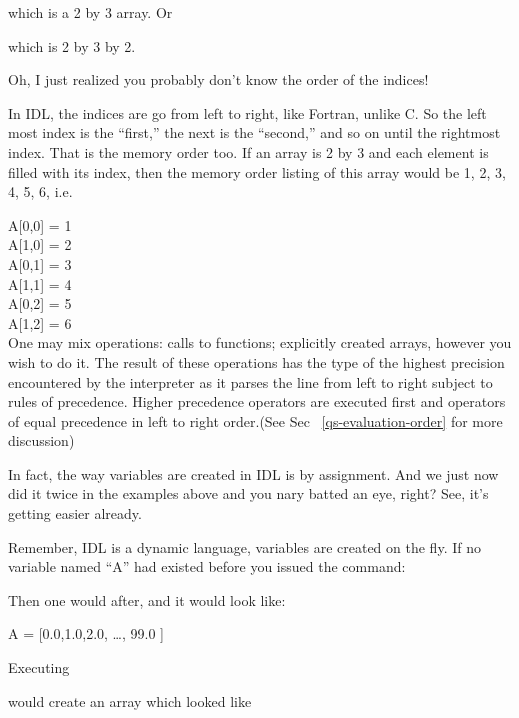 
  which is a 2 by 3 array. Or

	      
  which is 2 by 3 by 2.

  Oh, I just realized you probably don't know the order of the
  indices!

  In IDL, the indices are go from left to right, like Fortran, unlike
  C. So the left most index is the ``first,'' the next is the
  ``second,'' and so on until the rightmost index. That is the memory
  order too. If an array is 2 by 3 and each element is filled with its
  index, then the memory order listing of this array would be 1, 2, 3,
  4, 5, 6, i.e.

  A[0,0] = 1\\
  A[1,0] = 2\\
  A[0,1] = 3\\
  A[1,1] = 4\\
  A[0,2] = 5\\
  A[1,2] = 6\\

  One may mix operations: calls to functions; explicitly created arrays,
  however you wish to do it. The result of these operations has the type
  of the highest precision encountered by the interpreter as it parses
  the line from left to right subject to rules of precedence.  Higher
  precedence operators are executed first and operators of equal
  precedence in left to right order.(See Sec ~\ref{qs-evaluation-order}
    for more discussion)

  In fact, the  way variables are created in IDL is by
  assignment. And we just now did it twice in the examples above and
  you nary batted an eye, right? See, it's getting easier already.

  Remember, IDL is a dynamic language, variables are created on the
  fly. If no variable named ``A'' had existed before you issued the
  command:


  Then one would after, and it would look like:

     A = [0.0,1.0,2.0, \ldots , 99.0 ]

  Executing 

  would create an array which looked like

